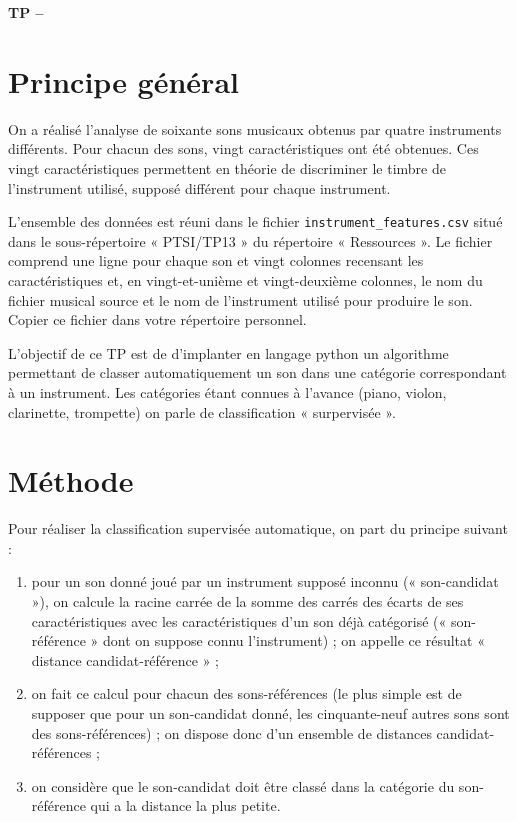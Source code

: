 

%



\begin{center}
{\Large\bf TP \no {\numero} -- \descrip}
\end{center}
 
\section{Principe général}

On a réalisé l'analyse de soixante sons musicaux obtenus par quatre instruments différents. Pour chacun des sons, vingt caractéristiques ont été obtenues. Ces vingt caractéristiques permettent en théorie de discriminer le timbre de l'instrument utilisé, supposé différent pour chaque instrument.

L'ensemble des données est réuni dans le fichier \verb|instrument_features.csv| situé dans le sous-répertoire « PTSI/TP13 » du répertoire « Ressources ». Le fichier comprend une ligne pour chaque son et vingt colonnes recensant les caractéristiques et, en vingt-et-unième et vingt-deuxième colonnes, le nom du fichier musical source et le nom de l'instrument utilisé pour produire le son. Copier ce fichier dans votre répertoire personnel.

L'objectif de ce TP est de d'implanter en langage python un algorithme permettant de classer automatiquement un son dans une catégorie correspondant à un instrument. Les catégories étant connues à l'avance (piano, violon, clarinette, trompette) on parle de classification « surpervisée ».

\section{Méthode}

Pour réaliser la classification supervisée automatique, on part du principe suivant : \begin{enumerate}
\item pour un son donné joué par un instrument supposé inconnu (« son-candidat »), on calcule la racine carrée de la somme des carrés des écarts de ses caractéristiques avec les caractéristiques d'un son déjà catégorisé (« son-référence » dont on suppose connu l'instrument) ; on appelle ce résultat « distance candidat-référence » ; 
\item on fait ce calcul pour chacun des sons-références (le plus simple est de supposer que pour un son-candidat donné, les cinquante-neuf autres sons sont des sons-références) ; on dispose donc d'un ensemble de distances candidat-références ;
\item on considère que le son-candidat doit être classé dans la catégorie du son-référence qui a la distance la plus petite.                                                                                                                                                                                                                                                                                                                                                                                                        \end{enumerate}


